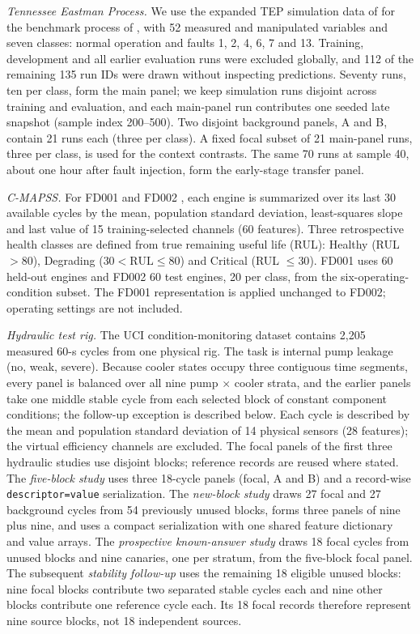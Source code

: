 \documentclass[11pt,a4paper]{article}
\begin{document}
\emph{Tennessee Eastman Process.} We use the expanded TEP simulation data of \citet{rieth2017additional} for the benchmark process of \citet{downs1993plant}, with 52 measured and manipulated variables and seven classes: normal operation and faults 1, 2, 4, 6, 7 and 13. Training, development and all earlier evaluation runs were excluded globally, and 112 of the remaining 135 run IDs were drawn without inspecting predictions. Seventy runs, ten per class, form the main panel; we keep simulation runs disjoint across training and evaluation, and each main-panel run contributes one seeded late snapshot (sample index 200--500). Two disjoint background panels, A and B, contain 21 runs each (three per class). A fixed focal subset of 21 main-panel runs, three per class, is used for the context contrasts. The same 70 runs at sample 40, about one hour after fault injection, form the early-stage transfer panel.

\emph{C-MAPSS.} For FD001 and FD002 \citep{saxena2008damage,saxena2008dataset}, each engine is summarized over its last 30 available cycles by the mean, population standard deviation, least-squares slope and last value of 15 training-selected channels (60 features). Three retrospective health classes are defined from true remaining useful life (RUL): Healthy (RUL $>80$), Degrading ($30<\text{RUL}\le80$) and Critical (RUL $\le30$). FD001 uses 60 held-out engines and FD002 60 test engines, 20 per class, from the six-operating-condition subset. The FD001 representation is applied unchanged to FD002; operating settings are not included.

\emph{Hydraulic test rig.} The UCI condition-monitoring dataset \citep{helwig2015hydraulicdata,helwig2015condition} contains 2{,}205 measured 60-s cycles from one physical rig. The task is internal pump leakage (no, weak, severe). Because cooler states occupy three contiguous time segments, every panel is balanced over all nine pump $\times$ cooler strata, and the earlier panels take one middle stable cycle from each selected block of constant component conditions; the follow-up exception is described below. Each cycle is described by the mean and population standard deviation of 14 physical sensors (28 features); the virtual efficiency channels are excluded. The focal panels of the first three hydraulic studies use disjoint blocks; reference records are reused where stated. The \emph{five-block study} uses three 18-cycle panels (focal, A and B) and a record-wise \texttt{descriptor=value} serialization. The \emph{new-block study} draws 27 focal and 27 background cycles from 54 previously unused blocks, forms three panels of nine plus nine, and uses a compact serialization with one shared feature dictionary and value arrays. The \emph{prospective known-answer study} draws 18 focal cycles from unused blocks and nine canaries, one per stratum, from the five-block focal panel. The subsequent \emph{stability follow-up} uses the remaining 18 eligible unused blocks: nine focal blocks contribute two separated stable cycles each and nine other blocks contribute one reference cycle each. Its 18 focal records therefore represent nine source blocks, not 18 independent sources.
\end{document}
